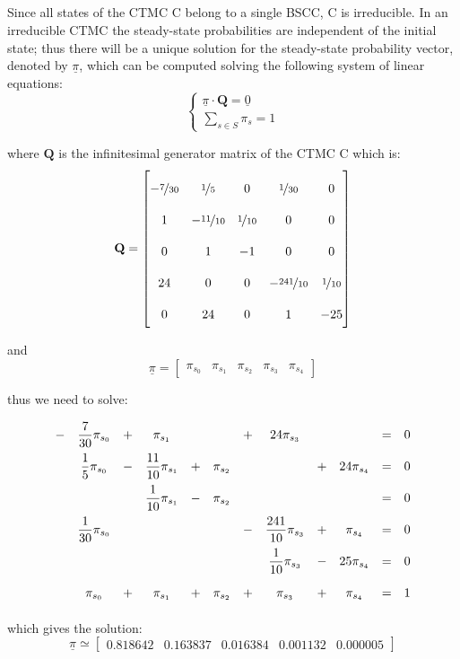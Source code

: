 \subsection{}
\label{subsec:1_b}

Since all states of the CTMC C belong to a single BSCC, C is irreducible. In
an irreducible CTMC the steady-state probabilities are independent of the
initial state; thus there will be a unique solution for the steady-state
probability vector, denoted by $\underline{\pi}$, which can be
computed solving the following system of linear equations:
\[
	\begin{cases}
		\underline{\pi} \cdot \mathbf{Q}  = \underline{0} \\
		\sum_{s \in S} \pi_s = 1
	\end{cases}
\]

where $\mathbf{Q}$ is the infinitesimal generator matrix of the CTMC C which
is:
\[
	\mathbf{Q} =
	\begin{bmatrix}
		-\nicefrac{7}{30} & \nicefrac{1}{5}    & 0                & \nicefrac{1}{30}    & 0                \\
		1                 & -\nicefrac{11}{10} & \nicefrac{1}{10} & 0                   & 0                \\
		0                 & 1                  & -1               & 0                   & 0                \\
		24                & 0                  & 0                & -\nicefrac{241}{10} & \nicefrac{1}{10} \\
		0                 & 24                 & 0                & 1                   & -25
	\end{bmatrix}
\]

and
\[
	\underline{\pi} =
	\begin{bmatrix}
		\pi_{s_0} & \pi_{s_1} & \pi_{s_2} & \pi_{s_3} & \pi_{s_4}
	\end{bmatrix}
\]

thus we need to solve:
\[
	\def\arraystretch{2.1}
	\begin{array}{cccccccccccc}
		- & \dfrac{7}{30} \pi_{s_0} & + & \pi_{s_1}                &   &           & + & 24 \pi_{s_3}              &   &              & = & 0 \\
		  & \dfrac{1}{5} \pi_{s_0}  & - & \dfrac{11}{10} \pi_{s_1} & + & \pi_{s_2} &   &                           & + & 24 \pi_{s_4} & = & 0 \\
		  &                         &   & \dfrac{1}{10} \pi_{s_1}  & - & \pi_{s_2} &   &                           &   &              & = & 0 \\
		  & \dfrac{1}{30} \pi_{s_0} &   &                          &   &           & - & \dfrac{241}{10} \pi_{s_3} & + & \pi_{s_4}    & = & 0 \\
		  &                         &   &                          &   &           &   & \dfrac{1}{10} \pi_{s_3}   & - & 25 \pi_{s_4} & = & 0 \\
		  & \pi_{s_0}               & + & \pi_{s_1}                & + & \pi_{s_2} & + & \pi_{s_3}                 & + & \pi_{s_4}    & = & 1
	\end{array}
\]

which gives the solution:
\[
	\underline{\pi} \simeq
	\begin{bmatrix}
		0.818642 & 0.163837 & 0.016384 & 0.001132 & 0.000005
	\end{bmatrix}
\]

